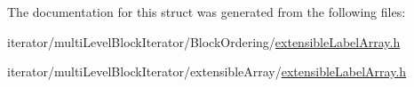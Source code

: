The documentation for this struct was generated from the following files:\begin{DoxyCompactItemize}
\item 
iterator/multiLevelBlockIterator/BlockOrdering/\hyperlink{BlockOrdering_2extensibleLabelArray_8h}{extensibleLabelArray.h}\item 
iterator/multiLevelBlockIterator/extensibleArray/\hyperlink{extensibleArray_2extensibleLabelArray_8h}{extensibleLabelArray.h}\end{DoxyCompactItemize}
